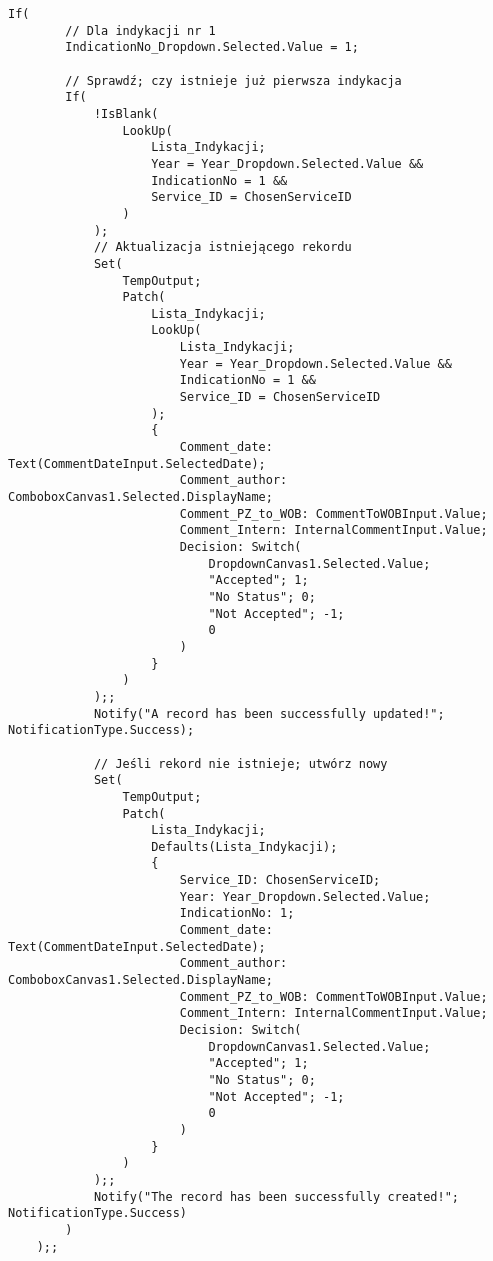 \begin{lstlisting}[language=PowerFx, caption={Kod zapisywania danych w formularzu edycji}, label=lst:SaveFormCode ]
    If(
        // Dla indykacji nr 1
        IndicationNo_Dropdown.Selected.Value = 1;
        
        // Sprawdź; czy istnieje już pierwsza indykacja
        If(
            !IsBlank(
                LookUp(
                    Lista_Indykacji;
                    Year = Year_Dropdown.Selected.Value &&
                    IndicationNo = 1 &&
                    Service_ID = ChosenServiceID
                )
            );
            // Aktualizacja istniejącego rekordu
            Set(
                TempOutput;
                Patch(
                    Lista_Indykacji;
                    LookUp(
                        Lista_Indykacji;
                        Year = Year_Dropdown.Selected.Value &&
                        IndicationNo = 1 &&
                        Service_ID = ChosenServiceID
                    );
                    {
                        Comment_date: Text(CommentDateInput.SelectedDate);
                        Comment_author: ComboboxCanvas1.Selected.DisplayName;
                        Comment_PZ_to_WOB: CommentToWOBInput.Value;
                        Comment_Intern: InternalCommentInput.Value;
                        Decision: Switch(
                            DropdownCanvas1.Selected.Value;
                            "Accepted"; 1;
                            "No Status"; 0;
                            "Not Accepted"; -1;
                            0
                        )
                    }
                )
            );;
            Notify("A record has been successfully updated!"; NotificationType.Success);
            
            // Jeśli rekord nie istnieje; utwórz nowy
            Set(
                TempOutput;
                Patch(
                    Lista_Indykacji;
                    Defaults(Lista_Indykacji);
                    {
                        Service_ID: ChosenServiceID;
                        Year: Year_Dropdown.Selected.Value;
                        IndicationNo: 1;
                        Comment_date: Text(CommentDateInput.SelectedDate);
                        Comment_author: ComboboxCanvas1.Selected.DisplayName;
                        Comment_PZ_to_WOB: CommentToWOBInput.Value;
                        Comment_Intern: InternalCommentInput.Value;
                        Decision: Switch(
                            DropdownCanvas1.Selected.Value;
                            "Accepted"; 1;
                            "No Status"; 0;
                            "Not Accepted"; -1;
                            0
                        )
                    }
                )
            );;
            Notify("The record has been successfully created!"; NotificationType.Success)
        )
    );;    
\end{lstlisting}